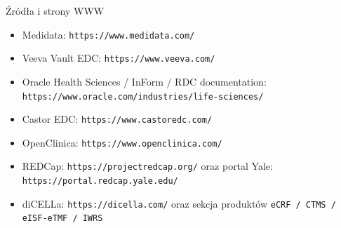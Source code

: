 \begin{frame}{Źródła i strony WWW}
  \footnotesize
  \begin{itemize}
    \item Medidata: \texttt{https://www.medidata.com/}
    \item Veeva Vault EDC: \texttt{https://www.veeva.com/}
    \item Oracle Health Sciences / InForm / RDC documentation: \texttt{https://www.oracle.com/industries/life-sciences/}
    \item Castor EDC: \texttt{https://www.castoredc.com/}
    \item OpenClinica: \texttt{https://www.openclinica.com/}
    \item REDCap: \texttt{https://projectredcap.org/} oraz portal Yale: \texttt{https://portal.redcap.yale.edu/}
    \item diCELLa: \texttt{https://dicella.com/} oraz sekcja produktów \texttt{eCRF / CTMS / eISF-eTMF / IWRS}
  \end{itemize}
\end{frame}
